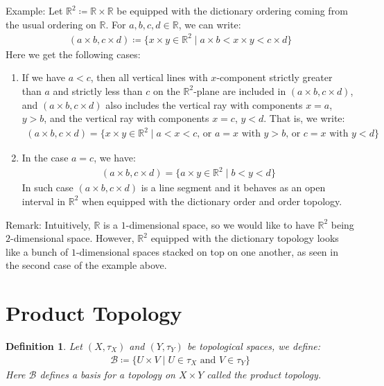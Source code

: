 \documentclass[11pt]{book}
\theoremstyle{break}
\theoremstyle{break}
\newtheorem{defn}{Definition}[corL]
\newcommand{\R}{\mathbb{R}}
\newcommand{\remark}{\color{blue}Remark: \color{black}}
\newcommand{\example}{\color{green}Example: \color{black}}
\begin{document}
\example Let $\R^2 \coloneqq \R \times \R$ be equipped with the dictionary ordering coming from the usual ordering on $\R$. For $a,b,c,d \in \R$, we can write:
\begin{align*}
\left( a\times b, c\times d\right) \coloneqq \{ x \times y \in \R^2 \mid a\times b < x\times y < c\times d \}
\end{align*}
Here we get the following cases:
\begin{enumerate}
\item If we have $a<c$, then all vertical lines with $x$-component strictly greater than $a$ and strictly less than $c$ on the $\R^2$-plane are included in $\left( a\times b, c\times d\right)$, and $\left( a\times b, c\times d\right)$ also includes the vertical ray with components $x =a$, $y>b$, and the vertical ray with components $x=c$, $y<d$. That is, we write:
\begin{align*}
\left( a\times b, c\times d\right) = \{ x\times y \in \R^2 \mid a<x<c \text{, or }a=x \text{ with } y>b \text{, or }c=x \text{ with } y<d\}
\end{align*} 
\item In the case $a=c$, we have:
\begin{align*}
\left( a\times b, c\times d\right) = \{ a\times y \in \R^2 \mid b<y<d\}
\end{align*}
In such case $\left( a\times b, c\times d\right)$ is a line segment and it behaves as an open interval in $\R^2$ when equipped with the dictionary order and order topology.
\end{enumerate}

\remark Intuitively, $\R$ is a $1$-dimensional space, so we would like to have $\R^2$ being $2$-dimensional space. However, $\R^2$ equipped with the dictionary topology looks like a bunch of $1$-dimensional spaces stacked on top on one another, as seen in the second case of the example above.

\newpage
\section[Product Topology]{\color{red} Product Topology\color{black}}
\begin{defn}
Let $(X,\tau_X)$ and $(Y,\tau_Y)$ be topological spaces, we define:
\begin{align*}
\mathcal{B} \coloneqq \{ U \times V \mid U \in \tau_X \text{ and } V \in \tau_Y\}
\end{align*}
Here $\mathcal{B}$ defines a basis for a topology on $X \times Y$ called the product topology.
\end{defn}
\end{document}
